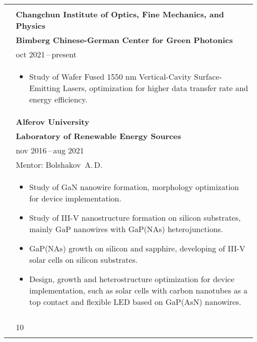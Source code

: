 \documentclass[letterpaper, 11pt]{article}
\begin{document}
\begin{longtable}{p{1.3in}p{4.8in}}
		
		\nohyphens{\color{OliveGreen}{Work experience}} \\
        & \textbf{Changchun Institute of Optics, Fine Mechanics, and Physics} \\
        & \textbf{Bimberg Chinese-German Center for Green Photonics} \\
		& \text{Postdoctoral researcher} \hfill oct 2021\,--\,present \\
        &
		\begin{itemize}
            \item Study of Wafer Fused 1550 nm Vertical-Cavity Surface-Emitting
                Lasers, optimization for higher data transfer rate and energy
                efficiency.
		\end{itemize} \\
		
        & \textbf{Alferov University} \\
        & \textbf{Laboratory of Renewable Energy Sources} \\
		& \text{Junior research assistant} \hfill nov 2016\,--\,aug 2021 \\
		& Mentor: Bolshakov~A.\,D. \\
        &
		\begin{itemize}
            \item Study of GaN nanowire formation, morphology optimization for
                device implementation.
            \item Study of III-V nanostructure formation on silicon substrates,
                mainly GaP nanowires with GaP(NAs) heterojunctions.
            \item GaP(NAs) growth on silicon and sapphire, developing of III-V
                solar cells on silicon substrates.
            \item Design, growth and heterostructure optimization for device
                implementation, such as solar cells with carbon nanotubes as a
                top contact and flexible LED based on GaP(AsN) nanowires.
		\end{itemize} \\

		\nohyphens{\color{OliveGreen}{h-index}} \\
        & 10 \\
		& \\
		
		

\end{longtable}
\end{document}
